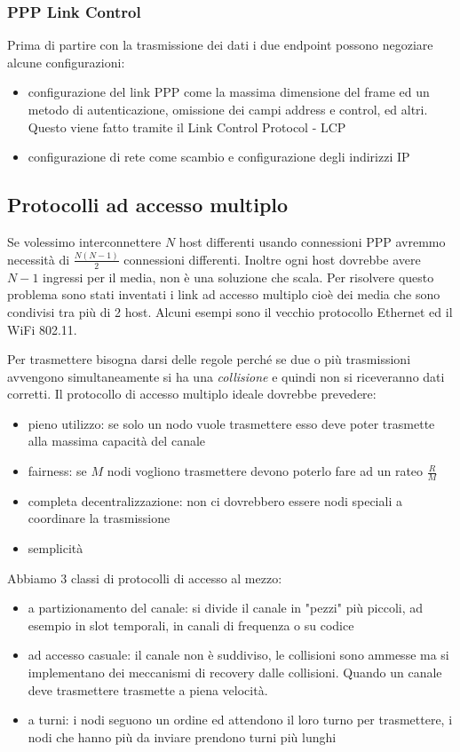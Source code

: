 \subsubsection{PPP Link Control}
Prima di partire con la trasmissione dei dati i due endpoint possono negoziare alcune configurazioni:
\begin{itemize}
    \item configurazione del link PPP come la massima dimensione del frame ed un metodo di autenticazione, omissione dei campi address e control, ed altri.
    Questo viene fatto tramite il Link Control Protocol - LCP
    
    \item configurazione di rete come scambio e configurazione degli indirizzi IP
\end{itemize}


\subsection{Protocolli ad accesso multiplo}
Se volessimo interconnettere $N$ host differenti usando connessioni PPP avremmo necessità di $\frac{N(N-1)}{2}$ connessioni differenti.
Inoltre ogni host dovrebbe avere $N-1$ ingressi per il media, non è una soluzione che scala.
Per risolvere questo problema sono stati inventati i link ad accesso multiplo cioè dei media che sono condivisi tra più di 2 host.
Alcuni esempi sono il vecchio protocollo Ethernet ed il WiFi 802.11.

Per trasmettere bisogna darsi delle regole perché se due o più trasmissioni avvengono simultaneamente si ha una \emph{collisione} e quindi non si riceveranno dati corretti.
Il protocollo di accesso multiplo ideale dovrebbe prevedere:
\begin{itemize}
    \item pieno utilizzo: se solo un nodo vuole trasmettere esso deve poter trasmette alla massima capacità del canale
    \item fairness: se $M$ nodi vogliono trasmettere devono poterlo fare ad un rateo $\frac{R}{M}$
    \item completa decentralizzazione: non ci dovrebbero essere nodi speciali a coordinare la trasmissione
    \item semplicità
\end{itemize}

Abbiamo 3 classi di protocolli di accesso al mezzo:
\begin{itemize}
    \item a partizionamento del canale: si divide il canale in "pezzi" più piccoli, ad esempio in slot temporali, in canali di frequenza o su codice

    \item ad accesso casuale: il canale non è suddiviso, le collisioni sono ammesse ma si implementano dei meccanismi di recovery dalle collisioni.
    Quando un canale deve trasmettere trasmette a piena velocità.
    
    \item a turni: i nodi seguono un ordine ed attendono il loro turno per trasmettere, i nodi che hanno più da inviare prendono turni più lunghi
\end{itemize}

